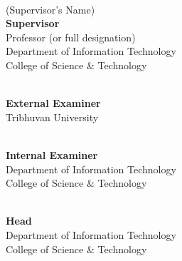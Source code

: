 \documentclass[a4paper,12pt]{report}
\begin{document}
\begin{flushleft}
    \begin{tabbing}
        \makebox[8cm]{\dotfill} \\
        (Supervisor’s Name)                     \\
        \textbf{Supervisor}                     \\
        Professor (or full designation)    \\
        Department of Information Technology    \\
        College of Science \& Technology        \\
    \end{tabbing}
    
    \vspace{1.5cm}
    
    \begin{tabbing}
        \makebox[8cm]{\dotfill} \\
        \textbf{External Examiner} \\
        Tribhuvan University \\
    \end{tabbing}
    
    \vspace{1.5cm}
    
    \begin{tabbing}
        \makebox[8cm]{\dotfill} \\
        \textbf{Internal Examiner} \\
        Department of Information Technology \\
        College of Science \& Technology \\
    \end{tabbing}
    
    \vspace{1.5cm}
    
    \begin{tabbing}
        \makebox[8cm]{\dotfill} \\
        \textbf{Head} \\
        Department of Information Technology \\
        College of Science \& Technology \\
    \end{tabbing}
\end{flushleft}
\end{document}
